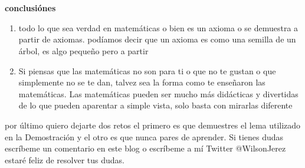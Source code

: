 \documentclass{article}
\begin{document}
\\ \\ 
\begin{center}
    \textbf{conclusiónes}
\end{center}
\begin{enumerate}
    \item todo lo que sea verdad en matemáticas o bien es un axioma o se demuestra a partir de axiomas.
    podíamos decir que un axioma es como una semilla de un árbol, es algo pequeño pero a partir
    \item Si piensas que las matemáticas no son para ti o que no te gustan o que simplemente no se te dan, talvez sea la forma como te enseñaron
    las matemáticas. Las matemáticas pueden ser mucho más didácticas y divertidas  de lo que pueden aparentar a simple vista, solo basta con mirarlas diferente
\end{enumerate}
por último quiero dejarte dos retos el primero es que demuestres el lema utilizado en la Demostración y el otro es que nunca pares de aprender. 
Si tienes dudas escríbeme un comentario en este blog o escríbeme a mí Twitter @WilsonJerez estaré feliz de resolver tus dudas.
\end{document}

